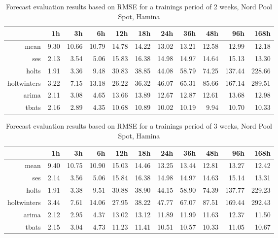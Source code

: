 \begin{table}[ht]
\centering
\begin{tabular}{rrrrrrrrrrr}
  \hline
 & 1h & 3h & 6h & 12h & 18h & 24h & 36h & 48h & 96h & 168h \\ 
  \hline
mean & 9.30 & 10.66 & 10.79 & 14.78 & 14.22 & 13.02 & 13.21 & 12.58 & 12.99 & 12.18 \\ 
  ses & 2.13 & 3.54 & 5.06 & 15.83 & 16.38 & 14.98 & 14.97 & 14.64 & 15.13 & 13.30 \\ 
  holts & 1.91 & 3.36 & 9.48 & 30.83 & 38.85 & 44.08 & 58.79 & 74.25 & 137.44 & 228.66 \\ 
  holtwinters & 3.22 & 7.15 & 13.18 & 26.22 & 36.32 & 46.07 & 65.31 & 85.66 & 167.14 & 289.51 \\ 
  arima & 2.11 & 3.08 & 4.65 & 13.66 & 13.89 & 12.67 & 12.87 & 12.61 & 13.68 & 12.98 \\ 
  tbats & 2.16 & 2.89 & 4.35 & 10.68 & 10.89 & 10.02 & 10.19 & 9.94 & 10.70 & 10.33 \\ 
   \hline
\end{tabular}
\caption{Forecast evaluation results based on RMSE for a trainings period of 2 weeks, Nord Pool Spot, Hamina}
\label{tab:app_results_hamina_2weeks}
\end{table}
\begin{table}[ht]
\centering
\begin{tabular}{rrrrrrrrrrr}
  \hline
 & 1h & 3h & 6h & 12h & 18h & 24h & 36h & 48h & 96h & 168h \\ 
  \hline
mean & 9.40 & 10.75 & 10.90 & 15.03 & 14.46 & 13.25 & 13.44 & 12.81 & 13.27 & 12.42 \\ 
  ses & 2.14 & 3.56 & 5.06 & 15.84 & 16.38 & 14.98 & 14.97 & 14.63 & 15.14 & 13.31 \\ 
  holts & 1.91 & 3.38 & 9.51 & 30.88 & 38.90 & 44.15 & 58.90 & 74.39 & 137.77 & 229.23 \\ 
  holtwinters & 3.44 & 7.61 & 14.06 & 27.95 & 38.22 & 47.77 & 67.07 & 87.51 & 169.44 & 292.43 \\ 
  arima & 2.12 & 2.95 & 4.37 & 13.02 & 13.12 & 11.89 & 11.99 & 11.63 & 12.37 & 11.50 \\ 
  tbats & 2.15 & 3.04 & 4.73 & 11.23 & 11.41 & 10.51 & 10.57 & 10.33 & 11.05 & 10.67 \\ 
   \hline
\end{tabular}
\caption{Forecast evaluation results based on RMSE for a trainings period of 3 weeks, Nord Pool Spot, Hamina}
\label{tab:app_results_hamina_3weeks}
\end{table}

